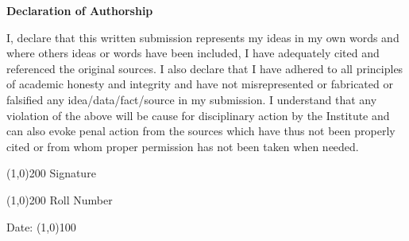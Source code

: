 \thispagestyle{empty}
\label{chap:declaration}
\begin{center}
{\Large \bf { Declaration of Authorship}}
\end{center}
\vspace{0.4in}

I, {\bf \who} declare that this written submission represents my ideas in my own words and where others
ideas or words have been included, I have adequately cited and referenced the original sources.
I also declare that I have adhered to all principles of academic honesty and integrity and have
not misrepresented or fabricated or falsified any idea/data/fact/source in my submission. I
understand that any violation of the above will be cause for disciplinary action by the Institute
and can also evoke penal action from the sources which have thus not been properly cited or
from whom proper permission has not been taken when needed.


\vspace{0.2in}

\begin{flushright}
\hfill
\line(1,0){200}
\newline
\hfill{Signature}
\end{flushright}

\vspace{0.1in}

\begin{flushright}
\hfill
\line(1,0){200}
\newline
\hfill{Roll Number}
\end{flushright}

\vspace{0.1in}

\begin{flushleft}
{Date: }\line(1,0){100} \hfill
\end{flushleft}
